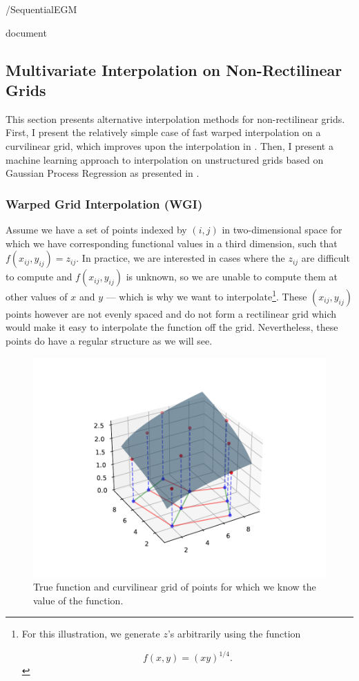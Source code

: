 \documentclass{article}
\title{}
\date{\displaydate{articleDate}}
\author{}
\begin{document}
\maketitle
\keywords{}/SequentialEGM

document

\subsection{Multivariate Interpolation on Non-Rectilinear Grids}\label{sec:gpr}

This section presents alternative interpolation methods for non-rectilinear grids. First, I present the relatively simple case of fast warped interpolation on a curvilinear grid, which improves upon the interpolation in \citet{White2015}. Then, I present a machine learning approach to interpolation on unstructured grids based on Gaussian Process Regression as presented in \citet{Scheidegger2019}.

\subsubsection{Warped Grid Interpolation (WGI)}\label{Warped Grid Interpolation (WGI)}

Assume we have a set of points indexed by $(i,j)$ in two-dimensional space for which we have corresponding functional values in a third dimension, such that $f(x_{ij},y_{ij}) = z_{ij}$. In practice, we are interested in cases where the $z_{ij}$ are difficult to compute and $f(x_{ij},y_{ij})$ is unknown, so we are unable to compute them at other values of $x$ and $y$ --- which is why we want to interpolate\footnote{For this illustration, we generate $z$'s arbitrarily using the function

\begin{equation}
f(x,y) = (xy)^{1/4}.
\end{equation}}. These $(x_{ij},y_{ij})$ points however are not evenly spaced and do not form a rectilinear grid which would make it easy to interpolate the function off the grid. Nevertheless, these points do have a regular structure as we will see.

\begin{figure}[!htbp]
\centering
\includegraphics[width=0.7\linewidth]{Figures/WarpedInterpolation.pdf}
\caption{True function and curvilinear grid of points for which we know the value of the function.}
\label{fig:warped_interp}
\end{figure}
\end{document}
